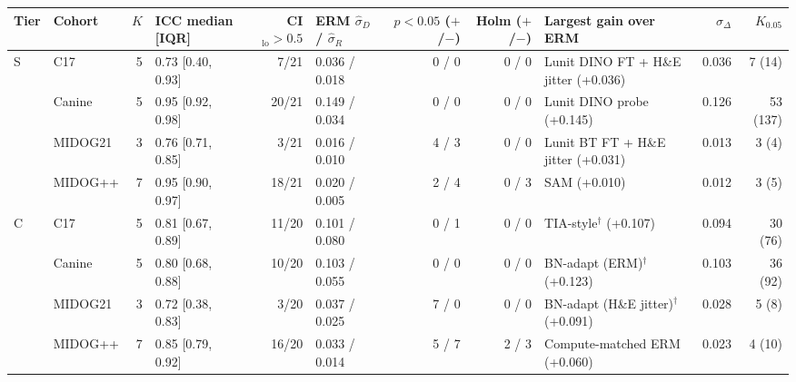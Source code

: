 \begin{tabular*}{\tblwidth}{@{\extracolsep{\fill}}llrlrlrr>{\raggedright\arraybackslash}p{2.2cm}rr@{}}
\toprule
Tier & Cohort & $K$ & ICC median [IQR] & CI$_{\text{lo}}>0.5$ & ERM $\hat\sigma_D$ / $\hat\sigma_R$ & $p<0.05$ ($+$/$-$) & Holm ($+$/$-$) & Largest gain over ERM & $\hat\sigma_\Delta$ & $K_{0.05}$ \\
\midrule
S & C17 & 5 & 0.73 [0.40, 0.93] & 7/21 & 0.036 / 0.018 & 0 / 0 & 0 / 0 & Lunit DINO FT + H\&E jitter (+0.036) & 0.036 & 7 (14) \\
 & Canine & 5 & 0.95 [0.92, 0.98] & 20/21 & 0.149 / 0.034 & 0 / 0 & 0 / 0 & Lunit DINO probe (+0.145) & 0.126 & 53 (137) \\
 & MIDOG21 & 3 & 0.76 [0.71, 0.85] & 3/21 & 0.016 / 0.010 & 4 / 3 & 0 / 0 & Lunit BT FT + H\&E jitter (+0.031) & 0.013 & 3 (4) \\
 & MIDOG++ & 7 & 0.95 [0.90, 0.97] & 18/21 & 0.020 / 0.005 & 2 / 4 & 0 / 3 & SAM (+0.010) & 0.012 & 3 (5) \\
\addlinespace[3pt]
C & C17 & 5 & 0.81 [0.67, 0.89] & 11/20 & 0.101 / 0.080 & 0 / 1 & 0 / 0 & TIA-style$^{\dagger}$ (+0.107) & 0.094 & 30 (76) \\
 & Canine & 5 & 0.80 [0.68, 0.88] & 10/20 & 0.103 / 0.055 & 0 / 0 & 0 / 0 & BN-adapt (ERM)$^{\dagger}$ (+0.123) & 0.103 & 36 (92) \\
 & MIDOG21 & 3 & 0.72 [0.38, 0.83] & 3/20 & 0.037 / 0.025 & 7 / 0 & 0 / 0 & BN-adapt (H\&E jitter)$^{\dagger}$ (+0.091) & 0.028 & 5 (8) \\
 & MIDOG++ & 7 & 0.85 [0.79, 0.92] & 16/20 & 0.033 / 0.014 & 5 / 7 & 2 / 3 & Compute-matched ERM (+0.060) & 0.023 & 4 (10) \\
\bottomrule
\end{tabular*}
